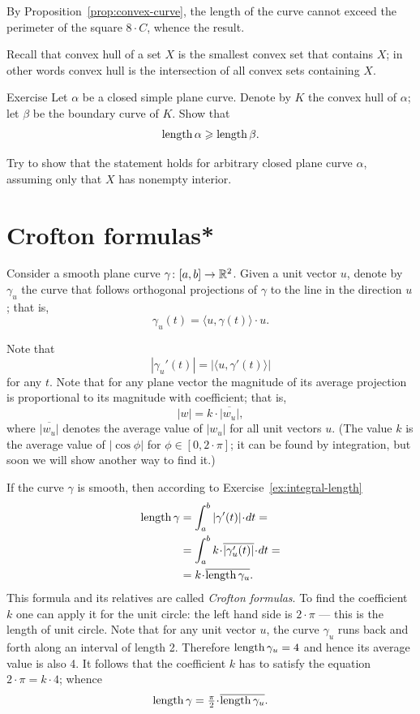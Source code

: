 By Proposition~\ref{prop:convex-curve}, the length of the curve cannot exceed the perimeter of the square $8\cdot C$, whence the result.
\qeds

Recall that convex hull of a set $X$ is the smallest convex set that contains $X$; in other words convex hull is the intersection of all convex sets containing $X$.

\begin{thm}{Exercise}\label{ex:convex-hull}
Let $\alpha$ be a closed simple plane curve.
Denote by $K$ the convex hull of $\alpha$; let $\beta$ be the boundary curve of $K$.
Show that 
\[\mathop{\rm length}\nolimits \alpha\geqslant \mathop{\rm length}\nolimits \beta.\]

Try to show that the statement holds for arbitrary closed plane curve $\alpha$, assuming only that $X$ has nonempty interior.
\end{thm}


\section*{Crofton formulas*}

Consider a smooth plane curve $\gamma\colon[a,b]\to\mathbb{R}^2$.
Given a unit vector $u$, denote by $\gamma_u$ the curve that follows orthogonal projections of $\gamma$ to the line in the direction $u$;
that is, 
\[\gamma_u(t)=\langle u,\gamma(t)\rangle\cdot u.\]

Note that 
\[|\gamma_u'(t)|=|\langle u,\gamma'(t)\rangle|\] for any $t$.
Note that for any plane vector the magnitude of its average projection is proportional to its magnitude with coefficient; that is,
\[|w|=k\cdot \overline{|w_u|},\]
where $\overline{|w_u|}$ denotes the average value of $|w_u|$ for all unit vectors $u$.
(The value $k$ is the average value of $|\cos\phi|$ for $\phi\in [0,2\cdot\pi]$; it can be found by integration, but soon we will show another way to find it.)

If the curve $\gamma$ is smooth, then according to Exercise~\ref{ex:integral-length}
\begin{align*}
\length\gamma
&=\int_a^b|\gamma'(t)|\cdot dt=
\\
&=\int_a^b  k\cdot \overline{|\gamma_u'(t)|}\cdot dt=
\\
&=k\cdot \overline{\length\gamma_u}.
\end{align*}
This formula and its relatives are called \emph{Crofton formulas}.
To find the coefficient $k$ one can apply it for the unit circle: the left hand side is $2\cdot\pi$ --- this is the length of unit circle.
Note that for any unit vector $u$, the curve $\gamma_u$ runs back and forth along an interval of length 2.
Therefore $\mathop{\rm length}\nolimits\gamma_u=4$ and hence its average value is also 4.
It follows that the coefficient $k$ has to satisfy the equation $2\cdot \pi =k\cdot 4$; whence 
\[
\length\gamma
=\tfrac\pi2\cdot \overline{\length\gamma_u}.
\]

